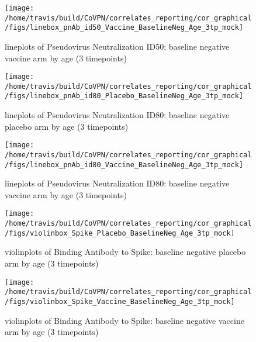 \documentclass[]{book}
\theoremstyle{definition}
\theoremstyle{definition}
\theoremstyle{definition}
\newcommand{\1}{\mathbbm{1}}
\begin{document}
\clearpage
\begin{figure}[H]

{\centering \texttt{[image: /home/travis/build/CoVPN/correlates\_reporting/cor\_graphical/figs/linebox\_pnAb\_id50\_Vaccine\_BaselineNeg\_Age\_3tp\_mock]} 

}

\caption{lineplots of Pseudovirus Neutralization ID50: baseline negative vaccine arm by age (3 timepoints)}\label{fig:unnamed-chunk-80}
\end{figure}

\clearpage
\begin{figure}[H]

{\centering \texttt{[image: /home/travis/build/CoVPN/correlates\_reporting/cor\_graphical/figs/linebox\_pnAb\_id80\_Placebo\_BaselineNeg\_Age\_3tp\_mock]} 

}

\caption{lineplots of Pseudovirus Neutralization ID80: baseline negative placebo arm by age (3 timepoints)}\label{fig:unnamed-chunk-81}
\end{figure}

\clearpage
\begin{figure}[H]

{\centering \texttt{[image: /home/travis/build/CoVPN/correlates\_reporting/cor\_graphical/figs/linebox\_pnAb\_id80\_Vaccine\_BaselineNeg\_Age\_3tp\_mock]} 

}

\caption{lineplots of Pseudovirus Neutralization ID80: baseline negative vaccine arm by age (3 timepoints)}\label{fig:unnamed-chunk-82}
\end{figure}

\clearpage
\begin{figure}[H]

{\centering \texttt{[image: /home/travis/build/CoVPN/correlates\_reporting/cor\_graphical/figs/violinbox\_Spike\_Placebo\_BaselineNeg\_Age\_3tp\_mock]} 

}

\caption{violinplots of Binding Antibody to Spike: baseline negative placebo arm by age (3 timepoints)}\label{fig:unnamed-chunk-83}
\end{figure}

\clearpage
\begin{figure}[H]

{\centering \texttt{[image: /home/travis/build/CoVPN/correlates\_reporting/cor\_graphical/figs/violinbox\_Spike\_Vaccine\_BaselineNeg\_Age\_3tp\_mock]} 

}

\caption{violinplots of Binding Antibody to Spike: baseline negative vaccine arm by age (3 timepoints)}\label{fig:unnamed-chunk-84}
\end{figure}
\end{document}
